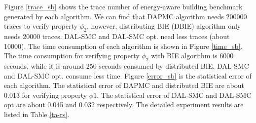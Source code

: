 \begin{figure}[htbp]
\end{figure}

Figure \ref{trace_sb} shows the trace number of energy-aware building benchmark generated by each algorithm. We can find that DAPMC algorithm needs 200000 traces to verify property $\phi_2$, however, distributing BIE (DBIE) algorithm only needs 20000 traces. DAL-SMC and DAL-SMC opt. need less traces (about 10000). The time consumption of each algorithm is shown in Figure \ref{time_sb}. The time consumption for verifying property $\phi_2$ with BIE algorithm is 6000 seconds, while it is around 250 seconds consumed by distributed BIE. DAL-SMC and DAL-SMC opt. consume less time. Figure \ref{error_sb} is the statistical error of each algorithm. The statistical error of DAPMC and distributed BIE are about 0.013 for verifying property $\phi1$. The statistical error of DAL-SMC and DAL-SMC opt are about 0.045 and 0.032 respectively. The detailed experiment results are listed in Table \ref{ta-rs}. 

